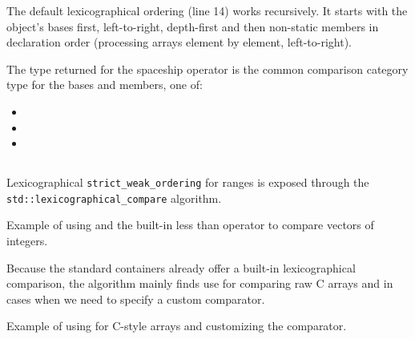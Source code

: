 The default lexicographical ordering (line 14) works recursively. It starts with the object’s bases first, left-to-right, depth-first and then non-static members in declaration order (processing arrays element by element, left-to-right).

The type returned for the spaceship operator is the common comparison category type for the bases and members, one of:
\begin{itemize}
    \item {}
    \item {}
    \item {}
\end{itemize}

\subsection{\texorpdfstring{}{\texttt{std::lexicographical\_compare}}}

Lexicographical \texttt{strict\_weak\_ordering} for ranges is exposed through the \newline\texttt{std::lexicographical\_compare} algorithm.



\begin{codebox}[breakable]{\href{https://compiler-explorer.com/z/YGW4ET1oa}{\ExternalLink}}
\footnotesize Example of using  and the built-in less than operator to compare vectors of integers.
\tcblower
{}
\end{codebox}

Because the standard containers already offer a built-in lexicographical comparison, the algorithm mainly finds use for comparing raw C arrays and in cases when we need to specify a custom comparator.

\begin{codebox}[]{\href{https://compiler-explorer.com/z/djs6TGsEs}{\ExternalLink}}
\footnotesize Example of using  for C-style arrays and customizing the comparator.
\tcblower
{}
\end{codebox}

